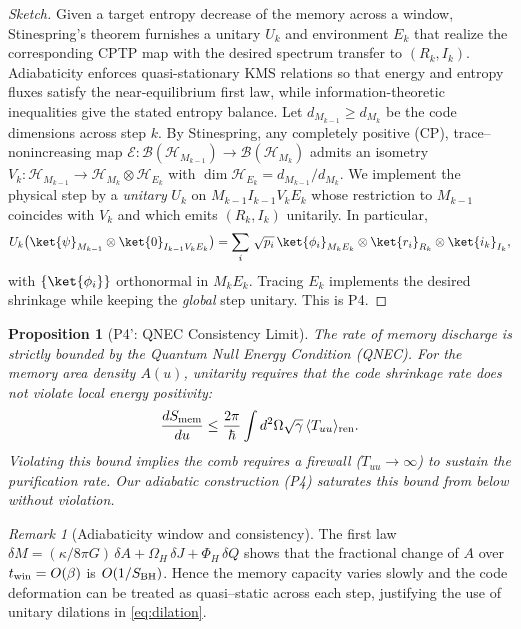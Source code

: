 \documentclass[11pt,a4paper]{article}
\theoremstyle{plain}
\newtheorem{proposition}[theorem]{Proposition}
\theoremstyle{definition}
\theoremstyle{remark}
\newtheorem{remark}[theorem]{Remark}
\begin{document}
\begin{proof}[Sketch]
Given a target entropy decrease of the memory across a window, Stinespring's theorem furnishes a unitary $U_k$ and environment $E_k$
that realize the corresponding CPTP map with the desired spectrum transfer to $(R_k,I_k)$. Adiabaticity enforces quasi-stationary KMS
relations so that energy and entropy fluxes satisfy the near-equilibrium first law, while information-theoretic inequalities give the
stated entropy balance.
Let $d_{M_{k-1}}\ge d_{M_k}$ be the code dimensions across step $k$. By Stinespring, any completely positive (CP), trace--nonincreasing map $\mathcal{E}:\mathcal{B}(\mathcal{H}_{M_{k-1}})\to\mathcal{B}(\mathcal{H}_{M_k})$ admits an isometry $V_k:\mathcal{H}_{M_{k-1}}\to\mathcal{H}_{M_k}\otimes\mathcal{H}_{E_k}$ with $\dim\mathcal{H}_{E_k}=d_{M_{k-1}}/d_{M_k}$. We implement the physical step by a \emph{unitary} $U_k$ on $M_{k-1}I_{k-1}V_kE_k$ whose restriction to $M_{k-1}$ coincides with $V_k$ and which emits $(R_k,I_k)$ unitarily. In particular,
\begin{equation}
\label{eq:dilation}
U_k\big(\ket{\psi}_{M_{k-1}}\otimes\ket{0}_{I_{k-1}V_kE_k}\big)
=\sum_{i}\,\sqrt{p_i}\,\ket{\phi_i}_{M_k E_k}\otimes\ket{r_i}_{R_k}\otimes\ket{i_k}_{I_k},
\end{equation}
with $\{\ket{\phi_i}\}$ orthonormal in $M_kE_k$. Tracing $E_k$ implements the desired shrinkage while keeping the \emph{global} step unitary. This is P4.
\end{proof}

\begin{proposition}[P4': QNEC Consistency Limit]\label{prop:qnec-consistency}
The rate of memory discharge is strictly bounded by the Quantum Null Energy Condition (QNEC). For the memory area density $A(u)$, unitarity requires that the code shrinkage rate does not violate local energy positivity:
\begin{equation}
\frac{d S_{\rm mem}}{du} \le \frac{2\pi}{\hbar} \int d^2\Omega \sqrt{\gamma} \, \langle T_{uu} \rangle_{\rm ren}.
\end{equation}
Violating this bound implies the comb requires a firewall ($T_{uu} \to \infty$) to sustain the purification rate. Our adiabatic construction (P4) saturates this bound from below without violation.
\end{proposition}

\begin{remark}[Adiabaticity window and consistency]\label{rem:adiabaticity_window}
The first law $\delta M=(\kappa/8\pi G)\,\delta A + \Omega_H\,\delta J+\Phi_H\,\delta Q$ shows that the fractional change of $A$ over $t_{\rm win}=O(\beta)$ is $O(1/S_{\rm BH})$. Hence the memory capacity varies slowly and the code deformation can be treated as quasi--static across each step, justifying the use of unitary dilations in \eqref{eq:dilation}.
\end{remark}
\end{document}
